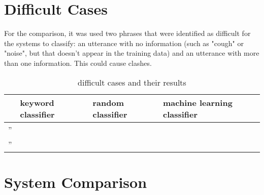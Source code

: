 \documentclass[a4paper]{article}
\begin{document}
\section{Difficult Cases}

For the comparison, it was used two phrases that were identified as difficult for the systems to classify: an utterance with no information (such as "cough" or "noise", but that doesn't appear in the training data) and an utterance with more than one information. This could cause clashes. 


\begin{table}[h!]
    \centering
    \begin{tabular}{l|l|l|l}
      & keyword classifier & random classifier & machine learning classifier \\ \hline
     '' & & & \\ \hline
     '' & & & \\
    \end{tabular}
    \caption{difficult cases and their results}
    \label{table4}
\end{table}{}

\section{System Comparison}
\end{document}
